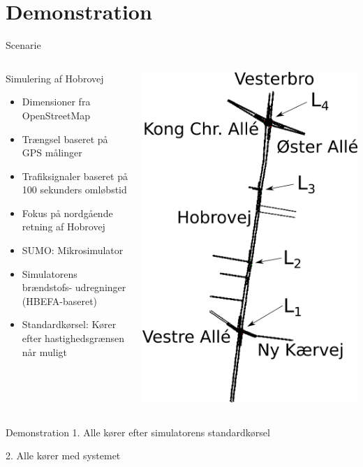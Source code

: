 \section{Demonstration}
\begin{frame}{Scenarie}
\begin{columns}
\begin{column}{0.6\textwidth}
Simulering af Hobrovej
\begin{itemize}
\item Dimensioner fra OpenStreetMap
\item Trængsel baseret på GPS målinger
\item Trafiksignaler baseret på 100 sekunders omløbstid
\item Fokus på nordgående retning af Hobrovej
\item SUMO: Mikrosimulator
\item Simulatorens brændstofs- udregninger (HBEFA-baseret)
\item Standardkørsel: Kører efter hastighedsgrænsen når muligt
\end{itemize}
\end{column}

\begin{column}{0.4\textwidth}
\includegraphics[width=1\textwidth]{../images/HobrovejL.png}
\end{column}
\end{columns}
\end{frame}

\begin{frame}{Demonstration}
1. Alle kører efter simulatorens standardkørsel
\vspace{4mm}

2. Alle kører med systemet
\end{frame}
